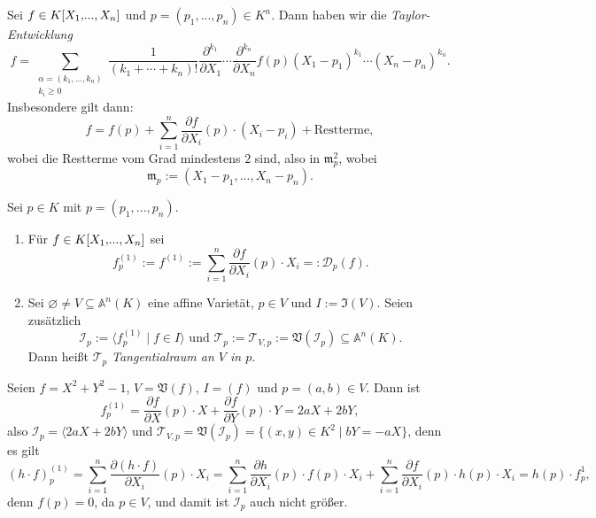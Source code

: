 \documentclass[a4paper,12pt,index=toc]{scrbook}
\theoremstyle{keinenummern} %
\def\A{\mathbb{A}}
\def\V{\mathfrak{V}}
\def\I{\mathfrak{I}}
\def\II{\mathcal{I}}
\newcommand{\DD}{\mathcal{D}} %
\def\T{\mathcal{T}}
\def\m{\mathfrak{m}}
\newcommand{\leer}{\ensuremath{\varnothing}}
\let\olddotsc\dotsc %
\renewcommand{\dotsc}{\ensuremath{\!...}}
\newcommand{\polyx}[1][n]{\ensuremath%
  [X_{1},\dotsc,X_{#1}]}
\begin{document}
\begin{erinnerung}\label{3.3.1}
Sei $f\in K\polyx$ und $p=(p_{1},\dotsc,p_{n})\in K^{n}$. Dann haben wir die \emph{Taylor-Entwicklung}
\begin{equation*}f=\!\!\!\!\sum_{\substack{\alpha=(k_{1},\olddotsc,k_{n})\\k_{i}\geq 0}}\!\!\frac{1}{(k_{1}+\dotsm+k_{n})!}\frac{\partial^{k_{1}}}{\partial X_{1}}\dotsm\frac{\partial^{k_{n}}}{\partial X_{n}}f(p)(X_{1}-p_{1})^{k_{1}}\dotsm(X_{n}-p_{n})^{k_{n}}.\end{equation*}
Insbesondere gilt dann:
\begin{equation*}f=f(p)+\sum_{i=1}^{n}\frac{\partial f}{\partial X_{i}}(p)\cdot(X_{i}-p_{i})+\text{Restterme},\end{equation*}
wobei die Restterme vom Grad mindestens $2$ sind, also in $\m_{p}^{2}$, wobei
\begin{equation*}\m_{p}:=(X_{1}-p_{1},\dotsc,X_{n}-p_{n}).\end{equation*}
\end{erinnerung}

\begin{dfn}\label{3.3.2}
Sei $p\in K$ mit $p=(p_{1},\dotsc,p_{n})$.
\begin{enumerate}
\item{} Für $f\in K\polyx$ sei
\begin{equation*}f_{p}^{(1)}:=f^{(1)}:=\sum_{i=1}^{n}\frac{\partial f}{\partial X_{i}}(p)\cdot X_{i}=:\DD_{p}(f).\end{equation*}
\item{} Sei $\leer\neq V\subseteq\A^{n}(K)$ eine affine Varietät, $p\in V$ und $I:=\I(V)$. Seien zusätzlich
\begin{equation*}\II_{p}:=\langle f_{p}^{(1)}\mid f\in I\rangle\text{ und }\T_{p}:=\T_{V,p}:=\V(\II_{p})\subseteq\A^{n}(K).\end{equation*}
Dann heißt $\T_{p}$ \emph{Tangentialraum an $V$ in $p$}.
\end{enumerate}\end{dfn}

\begin{bsp}\label{3.3.3}
Seien $f=X^{2}+Y^{2}-1$, $V=\V(f)$, $I=(f)$ und $p=(a,b)\in V$.
Dann ist
\begin{equation*}f_{p}^{(1)}=\frac{\partial f}{\partial X}(p)\cdot X+\frac{\partial f}{\partial Y}(p)\cdot Y=2aX + 2bY,\end{equation*}
also $\II_{p}=\langle 2aX+2bY \rangle$ und $\T_{V,p}=\V(\II_{p})=\{(x,y)\in K^{2}\mid bY=-aX\}$, denn es gilt
\begin{equation*}(h\cdot f)_{p}^{(1)}=\!\!\sum_{i=1}^{n}\frac{\partial(h\cdot f)}{\partial X_{i}}(p)\cdot X_{i}=\!\!\sum_{i=1}^{n}\frac{\partial h}{\partial X_{i}}(p)\cdot f(p)\cdot X_{i}+\sum_{i=1}^{n}\frac{\partial f}{\partial X_{i}}(p)\cdot h(p)\cdot X_{i}=h(p)\cdot f_{p}^{1},\end{equation*}
denn $f(p)=0$, da $p\in V$, und damit ist $\II_{p}$ auch nicht größer.
\end{bsp}
\end{document}
